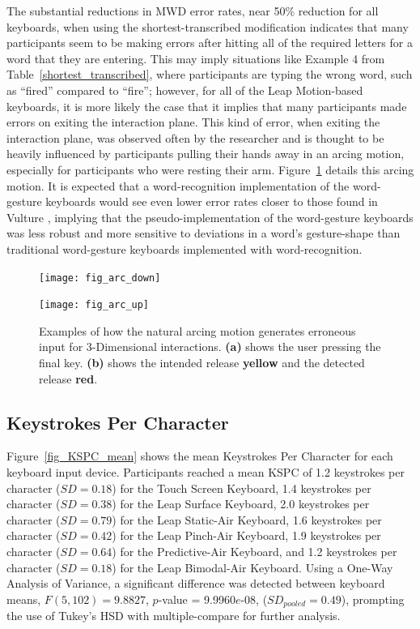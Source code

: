 The substantial reductions in MWD error rates, near 50\% reduction for all keyboards, when using the shortest-transcribed modification indicates that many participants seem to be making errors after hitting all of the required letters for a word that they are entering. This may imply situations like Example 4 from Table~\ref{shortest_transcribed}, where participants are typing the wrong word, such as ``fired'' compared to ``fire''; however, for all of the Leap Motion-based keyboards, it is more likely the case that it implies that many participants made errors on exiting the interaction plane. This kind of error, when exiting the interaction plane, was observed often by the researcher and is thought to be heavily influenced by participants pulling their hands away in an arcing motion, especially for participants who were resting their arm. Figure~\ref{arcing_motion} details this arcing motion. It is expected that a word-recognition implementation of the word-gesture keyboards would see even lower error rates closer to those found in Vulture \cite{ref_vulture}, implying that the pseudo-implementation of the word-gesture keyboards was less robust and more sensitive to deviations in a word's gesture-shape than traditional word-gesture keyboards implemented with word-recognition.

\begin{figure}[h]
	\centering
	\begin{minipage}[t]{2.5in}
		\texttt{[image: fig\_arc\_down]}
	\end{minipage}
	\begin{minipage}[t]{2.5in}
		\texttt{[image: fig\_arc\_up]}
	\end{minipage}
	\caption[Arcing Motion]{Examples of how the natural arcing motion generates erroneous input for 3-Dimensional interactions. \textbf{(a)} shows the user pressing the final key. \textbf{(b)} shows the intended release \textbf{yellow} and the detected release \textbf{red}.}
	\label{arcing_motion}
\end{figure}

\subsection{Keystrokes Per Character}
Figure~\ref{fig_KSPC_mean} shows the mean Keystrokes Per Character for each keyboard input device. Participants reached a mean KSPC of 1.2 keystrokes per character ($SD = 0.18$) for the Touch Screen Keyboard, 1.4 keystrokes per character  ($SD = 0.38$) for the Leap Surface Keyboard, 2.0 keystrokes per character ($SD = 0.79$) for the Leap Static-Air Keyboard, 1.6 keystrokes per character ($SD = 0.42$) for the Leap Pinch-Air Keyboard, 1.9 keystrokes per character ($SD = 0.64$) for the Predictive-Air Keyboard, and 1.2 keystrokes per character ($SD = 0.18$) for the Leap Bimodal-Air Keyboard. Using a One-Way Analysis of Variance, a significant difference was detected between keyboard means, $F(5, 102) = 9.8827$, $p$-value = 9.9960$e$-08, ($SD_{pooled} = 0.49$), prompting the use of Tukey's HSD with multiple-compare for further analysis.

